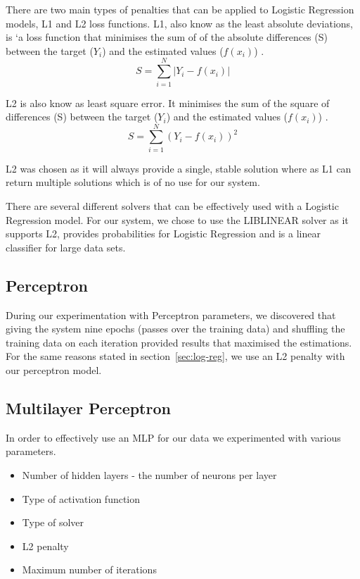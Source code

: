 \documentclass[bsc,frontabs,twoside,singlespacing,parskip,deptreport]{infthesis}     %
\begin{document}
 There are two main types of penalties that can be applied to Logistic Regression models, L1 and L2 loss functions.
 L1, also know as  the least absolute deviations, is `a loss function that minimises the sum of of the absolute
 differences (S) between the target ($Y_i$) and the estimated values ($f(x_{i})$) \cite{l1l2}.
 \begin{equation}
   S = \sum_{i=1}^{N} | Y_i - f(x_i)|\nonumber
   \end{equation}
 
 L2 is also know as least square error. It minimises the sum of the square of differences (S) between
 the target ($Y_i$) and the estimated values ($f(x_{i})$) \cite{l1l2}.
 \begin{equation}
   S = \sum_{i=1}^{N} ( Y_i - f(x_i))^2\nonumber
   \end{equation}

 L2 was chosen as it will always provide a single, stable solution where as L1 can return multiple solutions
 which is of no use for our system.

 There are several different solvers that can be effectively used with a Logistic Regression model.
 For our system, we chose to use the LIBLINEAR solver as it supports L2, provides probabilities
 for Logistic Regression and is a linear classifier for large data sets\cite{fan2008liblinear}.
 
 \subsection{Perceptron}
 During our experimentation with Perceptron parameters, we discovered that giving the system nine epochs (passes
 over the training data) and shuffling the training data on each iteration provided results that maximised the
 estimations. For the same reasons stated in section~\ref{sec:log-reg}, we use an L2 penalty with our perceptron
 model.
 
 \subsection{Multilayer Perceptron}
 In order to effectively use an MLP for our data we experimented with various parameters.
 \begin{itemize}
 \item Number of hidden layers - the number of neurons per layer
 \item Type of activation function
 \item Type of solver
 \item L2 penalty
 \item Maximum number of iterations
 \end{itemize}
 
\end{document}
